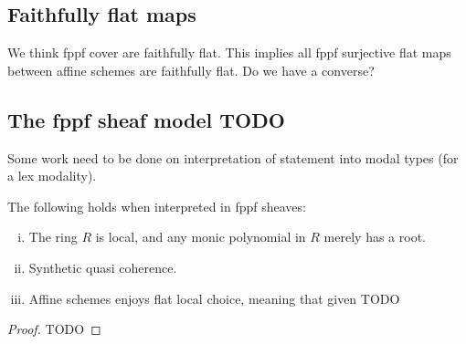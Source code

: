 \subsection{Faithfully flat maps}

We think fppf cover are faithfully flat. This implies all fppf surjective flat maps between affine schemes are faithfully flat. Do we have a converse?

\subsection{The fppf sheaf model TODO}

Some work need to be done on interpretation of statement into modal types (for a lex modality).

\begin{theorem}
The following holds when interpreted in fppf sheaves:
\begin{enumerate}[(i)]
\item The ring $R$ is local, and any monic polynomial in $R$ merely has a root.
\item Synthetic quasi coherence.
\item Affine schemes enjoys flat local choice, meaning that given TODO
\end{enumerate}
\end{theorem}

\begin{proof}
TODO
\end{proof}


